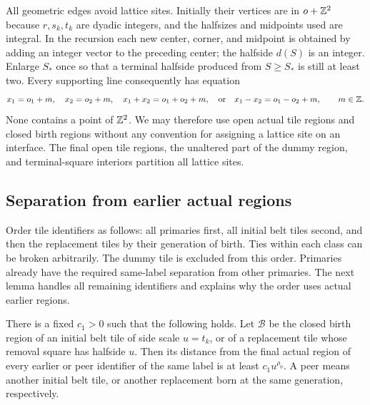All geometric edges avoid lattice sites.  Initially their vertices are
in $o+\mathbb Z^2$ because $r,s_k,t_k$ are dyadic integers, and the halfsizes and
midpoints used are integral.  In the recursion each new center, corner,
and midpoint is obtained by adding an integer vector to the preceding
center; the halfside $d(S)$ is an integer.  Enlarge $S_*$ once so that a
terminal halfside produced from $S\ge S_*$ is still at least two.
Every supporting line consequently has equation
\[
 x_1=o_1+m,\quad x_2=o_2+m,\quad
 x_1+x_2=o_1+o_2+m,\quad\text{or}\quad
 x_1-x_2=o_1-o_2+m,\qquad m\in\mathbb Z.
\]
None contains a point of $\mathbb Z^2$.  We may therefore use open actual tile
regions and closed birth regions without any convention for assigning a
lattice site on an interface.  The final open tile regions, the unaltered
part of the dummy region, and terminal-square interiors partition all
lattice sites.

\subsection{Separation from earlier actual regions}

Order tile identifiers as follows: all primaries first, all initial belt
tiles second, and then the replacement tiles by their generation of
birth.  Ties within each class can be broken arbitrarily.  The dummy tile
is excluded from this order.  Primaries already have the required
same-label separation from other primaries.  The next lemma handles all
remaining identifiers and explains why the order uses actual earlier
regions.

\begin{lemma}
\label{geometry:birth-separation}
There is a fixed $c_1>0$ such that the following holds.  Let $\mathcal B$
be the closed birth region of an initial belt tile of side scale $u=t_k$,
or of a replacement tile whose removal square has halfside $u$.
Then its distance from the final actual region of every earlier or peer
identifier of the same label is at least $c_1u^{\rho_0}$.  A peer means
another initial belt tile, or another replacement born at the same
generation, respectively.
\end{lemma}

